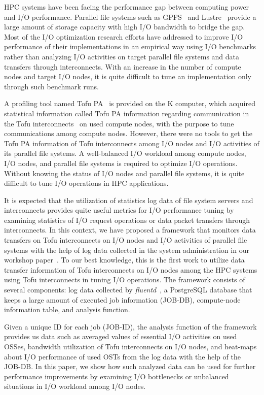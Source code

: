 \documentclass{jhps}
\begin{document}
HPC systems have been facing the performance gap between computing power and I/O performance.
Parallel file systems such as GPFS~\cite{gpfs:usenix02} and Lustre~\cite{lustre:web} provide
a large amount of storage capacity with high I/O bandwidth to bridge the gap.
Most of the I/O optimization research efforts have addressed to improve I/O performance
of their implementations in an empirical way using I/O benchmarks rather than
analyzing I/O activities on target parallel file systems and data transfers through interconnects.
With an increase in the number of compute nodes and target I/O nodes,
it is quite difficult to tune an implementation only through such benchmark runs.

A profiling tool named Tofu PA~\cite{profiler:fujitsu-tech-si} is provided on the K computer,
which acquired statistical information called Tofu PA information regarding communication
in the Tofu interconnects~\cite{tofu:micro2012} on used compute nodes, with the purpose
to tune communications among compute nodes.
However, there were no tools to get the Tofu PA information of Tofu interconnects
among I/O nodes and I/O activities of its parallel file systems.
A well-balanced I/O workload among compute nodes, I/O nodes, and parallel file systems
is required to optimize I/O operations. Without knowing the status of I/O nodes
and parallel file systems, it is quite difficult to tune I/O operations in HPC applications.

It is expected that the utilization of statistics log data of file system servers and
interconnects provides quite useful metrics for I/O performance tuning by examining statistics
of I/O request operations or data packet transfers through interconnects.
In this context, we have proposed a framework that monitors data transfers
on Tofu interconnects on I/O nodes and I/O activities of parallel file systems
with the help of log data collected in the system administration
in our workshop paper~\cite{tsujita:hpc_iodc20}.
To our best knowledge, this is the first work to utilize data transfer information of
Tofu interconnects on I/O nodes among the HPC systems using Tofu interconnects
in tuning I/O operations.
The framework consists of several components: log data collected by
{\itshape fluentd}~\cite{fluentd:web}, a PostgreSQL database that keeps a large amount
of executed job information (JOB-DB),
compute-node information table, and analysis function.

Given a unique ID for each job (JOB-ID), the analysis function of the framework
provides us data such as averaged values of essential I/O activities on used OSSes,
bandwidth utilization of Tofu interconnects on I/O nodes, and heat-maps about
I/O performance of used OSTs from the log data with the help of the JOB-DB.
In this paper, we show how such analyzed data can be used for further performance improvements
by examining I/O bottlenecks or unbalanced situations in I/O workload among I/O nodes.
\end{document}
